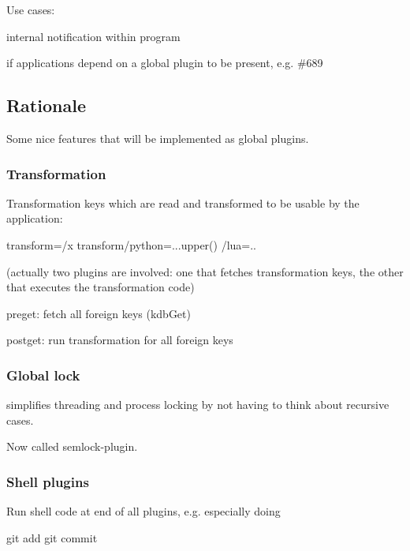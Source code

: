Use cases\+:


\begin{DoxyItemize}
\item internal notification within program
\item if applications depend on a global plugin to be present, e.\+g. \#689
\end{DoxyItemize}

\subsection*{Rationale}

Some nice features that will be implemented as global plugins.

\subsubsection*{Transformation}

Transformation keys which are read and transformed to be usable by the application\+: \begin{DoxyVerb}[dir/a]
transform=/x
transform/python=...upper()
         /lua=..
\end{DoxyVerb}


(actually two plugins are involved\+: one that fetches transformation keys, the other that executes the transformation code)


\begin{DoxyItemize}
\item preget\+: fetch all foreign keys (kdb\+Get)
\item postget\+: run transformation for all foreign keys
\end{DoxyItemize}

\subsubsection*{Global lock}

simplifies threading and process locking by not having to think about recursive cases.

Now called {\ttfamily semlock}-\/plugin.

\subsubsection*{Shell plugins}

Run shell code at end of all plugins, e.\+g. especially doing \begin{DoxyVerb}git add
git commit
\end{DoxyVerb}


